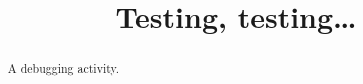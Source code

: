\documentclass{ximera}
\title{Testing, testing\dots}
\begin{document}
\begin{abstract}
  A debugging activity.
\end{abstract}
\maketitle


\end{document}
